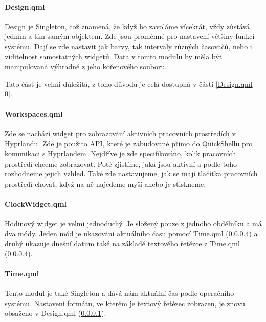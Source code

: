 \documentclass[12pt,a4paper]{article}
\begin{document}
\paragraph{Design.qml}
\label{Design.qml}
Design je Singleton, což znamená, že když ho zavoláme vícekrát, vždy zůstává jedním a tím samým objektem.
Zde jsou proměnné pro nastavení většiny funkcí systému. Dají se zde nastavit jak barvy, tak intervaly různých
časovačů, nebo i viditelnost samostatných widgetů. Data v tomto modulu by měla být manipulovaná výhradně z
jeho kořenového souboru.

Tato část je velmi důležitá, z toho důvodu je celá dostupná v části \ref{Design.qml 0}.

\paragraph{Workspaces.qml}
\label{Workspaces.qml}
Zde se nachází widget pro zobrazování aktivních pracovních prostředích v Hyprlandu. Zde je použito API, které je 
zabudované přímo do QuickShellu pro komunikaci s Hyprlandem. Nejdříve je zde specifikováno, kolik pracovních prostředí
chceme zobrazovat. Poté zjistíme, jaká jsou aktivní a podle toho rozhodneme jejich vzhled. Také zde nastavujeme, jak se
mají tlačítka pracovních prostředí chovat, když na ně najedeme myší anebo je stiskneme.

\paragraph{ClockWidget.qml}
\label{ClockWidget.qml}
Hodinový widget je velmi jednoduchý. Je složený pouze z jednoho obdélníku a má dva módy. Jeden mód je ukazování aktuálního
času pomocí Time.qml (\ref{Time.qml}) a druhý ukazuje dnešní datum také na základě textového řetězce z Time.qml (\ref{Time.qml}).

\paragraph{Time.qml}
\label{Time.qml}
Tento modul je také Singleton a dává nám aktuální čas podle operačního systému. Nastavení formátu, ve kterém je textový
řetězec zobrazen, je znovu obsaženo v Design.qml (\ref{Design.qml}).
\end{document}
